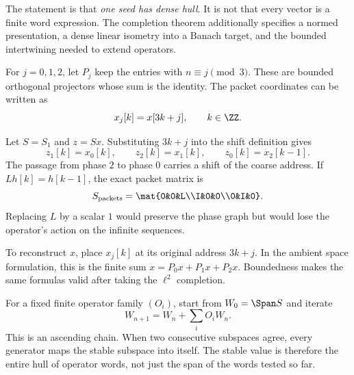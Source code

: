 The statement is that \emph{one seed has dense hull}. It is not that every vector is a finite word expression. The completion theorem additionally specifies a normed presentation, a dense linear isometry into a Banach target, and the bounded intertwining needed to extend operators.


For $j=0,1,2$, let $P_j$ keep the entries with $n\equiv j\pmod3$. These are bounded orthogonal projectors whose sum is the identity. The packet coordinates can be written as
\[
x_j[k]=x[3k+j],\qquad k\in\ZZ.
\]


Let $S=S_1$ and $z=Sx$. Substituting $3k+j$ into the shift definition gives
\[
z_1[k]=x_0[k],\qquad z_2[k]=x_1[k],\qquad z_0[k]=x_2[k-1].
\]
The passage from phase $2$ to phase $0$ carries a shift of the coarse address. If $Lh[k]=h[k-1]$, the exact packet matrix is
\[
S_{\mathrm{packets}}=\mat{0&0&L\\I&0&0\\0&I&0}.
\]
Replacing $L$ by a scalar $1$ would preserve the phase graph but would lose the operator's action on the infinite sequences.

To reconstruct $x$, place $x_j[k]$ at its original address $3k+j$. In the ambient space formulation, this is the finite sum $x=P_0x+P_1x+P_2x$. Boundedness makes the same formulas valid after taking the $\ell^2$ completion.


For a fixed finite operator family $(O_i)$, start from $W_0=\Span S$ and iterate
\[
W_{n+1}=W_n+\sum_i O_iW_n.
\]
This is an ascending chain. When two consecutive subspaces agree, every generator maps the stable subspace into itself. The stable value is therefore the entire hull of operator words, not just the span of the words tested so far.


